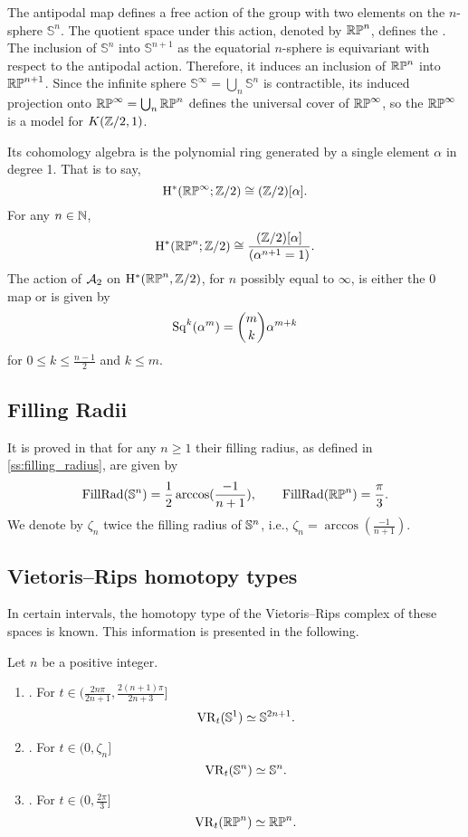 The antipodal map defines a free action of the group with two elements on the $n$-sphere \(\mathbb{S}^n\).
The quotient space under this action, denoted by \(\mathbb{RP}^n\), defines the .
The inclusion of \(\mathbb{S}^n\) into \(\mathbb{S}^{n+1}\) as the equatorial $n$-sphere is equivariant with respect to the antipodal action.
Therefore, it induces an inclusion of \(\mathbb{RP}^n\) into \(\mathbb{RP}^{n+1}\).
Since the infinite sphere \(\mathbb{S}^\infty = \bigcup_n \mathbb{S}^n\) is contractible, its induced projection onto $\mathbb{RP}^\infty = \bigcup_n \mathbb{RP}^n$ defines the universal cover of \(\mathbb{RP}^\infty\), so the  $\mathbb{RP}^\infty$ is a model for \(K(\mathbb{Z}/2, 1)\).

Its cohomology algebra is the polynomial ring generated by a single element $\alpha$ in degree 1.
That is to say,
\[
\mathrm{H}^\ast(\mathbb{RP}^\infty; \mathbb{Z}/2) \cong (\mathbb{Z}/2)[\alpha].
\]
For any $n \in \mathbb{N}$,
\[
\mathrm{H}^\ast(\mathbb{RP}^n; \mathbb{Z}/2) \cong \frac{(\mathbb{Z}/2)[\alpha]}{(\alpha^{n+1} = 1)}.
\]
The action of $\mathcal{A}_2$ on $\mathrm{H}^*(\mathbb{RP}^n, \mathbb{Z}/2)$, for $n$ possibly equal to $\infty$, is either the 0 map or is given by
\[
\operatorname{Sq}^k(\alpha^m) = \binom{m}{k}\alpha^{m+k}
\]
for $0 \leq k \leq \frac{n-1}{2}$ and $k \leq m$.

\subsection{Filling Radii}

It is proved in \cite{katz1983filling} that for any $n \geq 1$ their filling radius, as defined in \cref{ss:filling_radius}, are given by
\[
\operatorname{FillRad}(\mathbb{S}^n) = \frac{1}{2}\arccos(\frac{-1}{n+1}), \qquad
\operatorname{FillRad}(\mathbb{RP}^n) = \frac{\pi}{3}.
\]
We denote by $\zeta_n$ twice the filling radius of $\mathbb{S}^n$, i.e., $\zeta_n = \arccos(\frac{-1}{n+1})$.

\subsection{Vietoris--Rips homotopy types}

In certain intervals, the homotopy type of the Vietoris--Rips complex of these spaces is known.
This information is presented in the following.

\medskip\proposition Let $n$ be a positive integer.
\begin{enumerate}[{\rm (a)}]
	\item\label{prop:S1}{\rm \cite[Thm.~7.4]{adamaszek2017vietoris}.}
	For $t \in (\frac{2n\pi}{2n+1}, \frac{2(n+1)\pi}{2n+3}]$
	\[
	\operatorname{VR}_t(\mathbb{S}^1) \simeq \mathbb{S}^{2n+1}.
	\]
	
	\item\label{prop:Sn}{\rm \cite[Thm.~10]{lim2020vietoris}.}
	For $t \in (0, \zeta_n]$
	\[
	\operatorname{VR}_t(\mathbb{S}^n) \simeq \mathbb{S}^n.
	\]
	
	\item\label{prop:RPn}{\rm \cite[Thm.~4.5]{adams2022metric}.}
	For $t \in (0,\frac{2\pi}{3} ]$
	\[
	\operatorname{VR}_t(\mathbb{RP}^n) \simeq \mathbb{RP}^n.
	\]
\end{enumerate}
